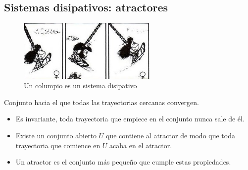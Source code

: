 \documentclass[8pt]{beamer}
\begin{document}
\subsection{Sistemas disipativos: atractores}
\begin{frame}
\begin{figure}[hbtp]
\centering
\includegraphics[width = 0.6\textwidth]{img/columpio.jpg}
\caption{Un columpio es un sistema disipativo}
\end{figure}
\begin{definition}[Atractor]
Conjunto hacia el que todas las trayectorias cercanas convergen.
\begin{itemize}
\item Es invariante, toda trayectoria que empiece en el conjunto nunca sale de él.
\item Existe un conjunto abierto $U$ que contiene al atractor de modo que toda trayectoria que comience en $U$ acaba en el atractor.
\item Un atractor es el conjunto más pequeño que cumple estas propiedades.
\end{itemize}
\end{definition}
\end{frame}
\end{document}

